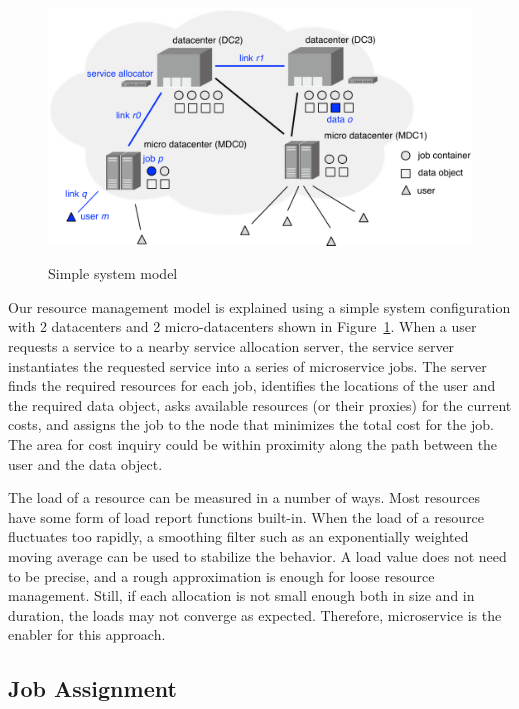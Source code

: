 
\begin{figure}[tb]
  \begin{center}
    \includegraphics[width=1.0\columnwidth]{system.pdf}
    \vspace{-2.0ex}
    \caption{Simple system model}
    \label{fig:system}
  \end{center}
\end{figure}

Our resource management model is explained using a simple system
configuration with 2 datacenters and 2 micro-datacenters shown in
Figure~\ref{fig:system}.
When a user requests a service to a nearby service allocation server,
the service server instantiates the requested service into a series of
microservice jobs.
The server finds the required resources for each job,
identifies the locations of the user and the required data object,
asks available resources (or their proxies) for the current costs,
and assigns the job to the node that minimizes the total cost for the
job.
The area for cost inquiry could be within proximity along the path
between the user and the data object.

The load of a resource can be measured in a number of ways.  Most
resources have some form of load report functions built-in.
When the load of a resource fluctuates too rapidly,
a smoothing filter such as an exponentially weighted moving average
can be used to stabilize the behavior.
A load value does not need to be precise, and a rough approximation is
enough for loose resource management.
Still, if each allocation is not small enough both in size and in
duration, the loads may not converge as expected.
Therefore, microservice is the enabler for this approach.

\subsection{Job Assignment}


